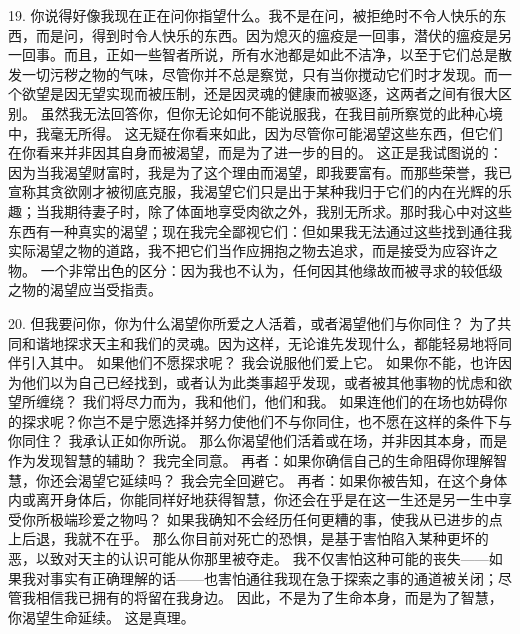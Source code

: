 19.  你说得好像我现在正在问你指望什么。我不是在问，被拒绝时不令人快乐的东西，而是问，得到时令人快乐的东西。因为熄灭的瘟疫是一回事，潜伏的瘟疫是另一回事。而且，正如一些智者所说，所有水池都是如此不洁净，以至于它们总是散发一切污秽之物的气味，尽管你并不总是察觉，只有当你搅动它们时才发现。而一个欲望是因无望实现而被压制，还是因灵魂的健康而被驱逐，这两者之间有很大区别。 虽然我无法回答你，但你无论如何不能说服我，在我目前所察觉的此种心境中，我毫无所得。 这无疑在你看来如此，因为尽管你可能渴望这些东西，但它们在你看来并非因其自身而被渴望，而是为了进一步的目的。 这正是我试图说的：因为当我渴望财富时，我是为了这个理由而渴望，即我要富有。而那些荣誉，我已宣称其贪欲刚才被彻底克服，我渴望它们只是出于某种我归于它们的内在光辉的乐趣；当我期待妻子时，除了体面地享受肉欲之外，我别无所求。那时我心中对这些东西有一种真实的渴望；现在我完全鄙视它们：但如果我无法通过这些找到通往我实际渴望之物的道路，我不把它们当作应拥抱之物去追求，而是接受为应容许之物。 一个非常出色的区分：因为我也不认为，任何因其他缘故而被寻求的较低级之物的渴望应当受指责。\par

20. 但我要问你，你为什么渴望你所爱之人活着，或者渴望他们与你同住？ 为了共同和谐地探求天主和我们的灵魂。因为这样，无论谁先发现什么，都能轻易地将同伴引入其中。 如果他们不愿探求呢？ 我会说服他们爱上它。 如果你不能，也许因为他们以为自己已经找到，或者认为此类事超乎发现，或者被其他事物的忧虑和欲望所缠绕？ 我们将尽力而为，我和他们，他们和我。 如果连他们的在场也妨碍你的探求呢？你岂不是宁愿选择并努力使他们不与你同住，也不愿在这样的条件下与你同住？ 我承认正如你所说。 那么你渴望他们活着或在场，并非因其本身，而是作为发现智慧的辅助？ 我完全同意。 再者：如果你确信自己的生命阻碍你理解智慧，你还会渴望它延续吗？ 我会完全回避它。 再者：如果你被告知，在这个身体内或离开身体后，你能同样好地获得智慧，你还会在乎是在这一生还是另一生中享受你所极端珍爱之物吗？ 如果我确知不会经历任何更糟的事，使我从已进步的点上后退，我就不在乎。 那么你目前对死亡的恐惧，是基于害怕陷入某种更坏的恶，以致对天主的认识可能从你那里被夺走。 我不仅害怕这种可能的丧失——如果我对事实有正确理解的话——也害怕通往我现在急于探索之事的通道被关闭；尽管我相信我已拥有的将留在我身边。 因此，不是为了生命本身，而是为了智慧，你渴望生命延续。 这是真理。\par

